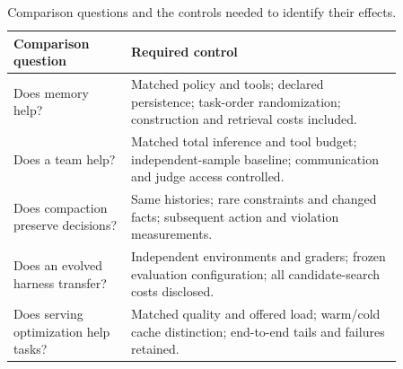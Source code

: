 \begin{table}[!htbp]
\centering
\caption{Comparison questions and the controls needed to identify their effects.}\label{tab:C02:controls}
\begin{tabular}{L{0.26\linewidth}L{0.60\linewidth}}

\toprule Comparison question & Required control\\\midrule
Does memory help? & Matched policy and tools; declared persistence; task-order randomization; construction and retrieval costs included.\\
Does a team help? & Matched total inference and tool budget; independent-sample baseline; communication and judge access controlled.\\
Does compaction preserve decisions? & Same histories; rare constraints and changed facts; subsequent action and violation measurements.\\
Does an evolved harness transfer? & Independent environments and graders; frozen evaluation configuration; all candidate-search costs disclosed.\\
Does serving optimization help tasks? & Matched quality and offered load; warm/cold cache distinction; end-to-end tails and failures retained.\\
\bottomrule
\end{tabular}
\end{table}

